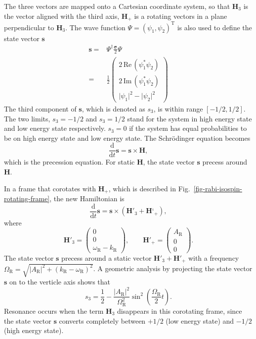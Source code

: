 The three vectors are mapped onto a Cartesian coordinate system, so that $\mathbf{H}_3$ is the vector aligned with the third axis, $\mathbf{H}_+$ is a rotating vectors in a plane perpendicular to $\mathbf{H}_3$. The wave function $\Psi=(\psi_1,\psi_2)^{\mathrm{T}}$ is also used to define the state vector $\mathbf{s}$
\begin{align}
    \mathbf{s} =& \Psi^\dagger \frac{\boldsymbol{\sigma}}{2}\Psi \\
    =& \frac{1}{2}\begin{pmatrix}
    2\,\mathrm{Re}\,(\psi_1^* \psi_2) \\
    2\,\mathrm{Im}\,(\psi_1^*\psi_2) \\
    \lvert \psi_1 \rvert^2 - \lvert \psi_2 \rvert^2
    \end{pmatrix}
\end{align}
The third component of $\mathbf{s}$, which is denoted as $s_3$, is within range $[-1/2,1/2]$. The two limits, $s_3=-1/2$ and $s_3=1/2$ stand for the system in high energy state and low energy state respectively. $s_3=0$ if the system has equal probabilities to be on high energy state and low energy state. The Schr\"odinger equation becomes
\begin{equation}
\frac{\mathrm{d}}{\mathrm{d} t } \mathbf{s} = \mathbf{s} \times \mathbf{H},
\end{equation}
which is the precession equation. For static $\mathbf{H}$, the state vector $\mathbf{s}$ precess around $\mathbf{H}$.

In a frame that corotates with $\mathbf{H}_+$, which is described in Fig.~\ref{fig-rabi-isospin-rotating-frame}, the new Hamiltonian is
\begin{equation}
\frac{\mathrm d}{\mathrm d t } \mathbf{s} = \mathbf{s} \times (\mathbf{H}'_3 + \mathbf{H}‘_+),
\end{equation}
where
\begin{equation}
\mathbf{H}'_3 = \begin{pmatrix}
    0 \\ 0 \\ 　\omega_{\mathrm{R}} - k_{\mathrm R}
    \end{pmatrix}, \qquad \mathbf{H}'_+ = \begin{pmatrix}
    A_{\mathrm{R}} \\ 0 \\ 　0
    \end{pmatrix}.
\end{equation}
The state vector $\mathbf{s}$ precess around a static vector $\mathbf{H}'_3 + \mathbf{H}'_+$ with a frequency $\Omega_{\mathrm R} = \sqrt{ \lvert A_{\mathrm{R}}\rvert^2 + (k_{\mathrm{R}} - \omega_{\mathrm R})^2 }$. A geometric analysis by projecting the state vector $\mathbf{s}$ on to the verticle axis shows that
\begin{equation}
s_3 = \frac{1}{2} - \frac{\lvert A_{\mathrm R}\rvert ^2}{\Omega_{\mathrm R}^2}\sin^2\left(\frac{\Omega_{\mathrm R}}{2} t\right).
\end{equation}
Resonance occurs when the term $\mathbf{H}_3$ disappears in this corotating frame, since the state vector $\mathbf{s}$ converts completely between $+1/2$ (low energy state) and $-1/2$ (high energy state).



